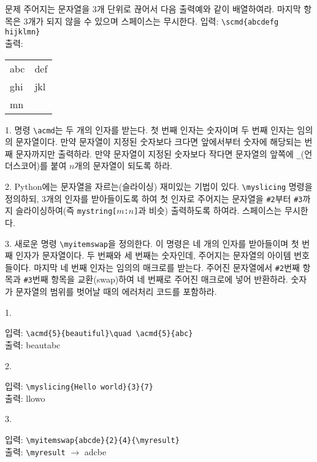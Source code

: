 \documentclass[a4paper,amsmath,itemph]{oblivoir}
\begin{document}
\vfill

\clearpage

\begin{questiona}{문제}
주어지는 문자열을 3개 단위로 끊어서 다음 출력예와 같이 배열하여라. 마지막 항목은 3개가 되지 않을 수 있으며 스페이스는 무시한다.
\tcblower
입력: \verb|\scmd{abcdefg hijklmn}|\\
출력: 
\begin{tabular}[t]{ll}
abc & def \\
ghi & jkl \\
mn & \\
\end{tabular}
\end{questiona}

\vfill

\begin{questionp}
 1. 명령 \verb|\acmd|는 두 개의 인자를 받는다. 첫 번째 인자는 숫자이며 두 번째 인자는 임의의 문자열이다. 만약 문자열이 지정된 숫자보다 크다면 앞에서부터 숫자에 해당되는 번째 문자까지만 출력하라. 만약 문자열이 지정된 숫자보다 작다면 문자열의 앞쪽에 \verb|_|(언더스코어)를 붙여 $n$개의 문자열이 되도록 하라.

\bigskip

 2. Python에는 문자열을 자르는(슬라이싱) 재미있는 기법이 있다. \verb|\myslicing| 명령을 정의하되, 3개의 인자를 받아들이도록 하여 첫 인자로 주어지는 문자열을 \verb|#2|부터 \verb|#3|까지 슬라이싱하여(즉 \verb|mystring[|$m$\verb|:|$n$\verb|]|과 비슷) 출력하도록 하여라. 스페이스는 무시한다.

\bigskip

 3. 새로운 명령 \verb|\myitemswap|을 정의한다. 이 명령은 네 개의 인자를 받아들이며 첫 번째 인자가 문자열이다. 두 번째와 세 번째는 숫자인데, 주어지는 문자열의 아이템 번호들이다. 마지막 네 번째 인자는 임의의 매크로를 받는다. 주어진 문자열에서 \verb|#2|번째 항목과 \verb|#3|번째 항목을 교환(swap)하여 네 번째로 주어진 매크로에 넣어 반환하라. 숫자가 문자열의 범위를 벗어날 때의 에러처리 코드를 포함하라.

\tcblower

1. \begin{minipage}[t]{\dimexpr\textwidth-3em\relax}
입력: \verb|\acmd{5}{beautiful}\quad \acmd{5}{abc}| \\
출력: beaut\quad \textunderscore\textunderscore abc
\end{minipage}

\medskip

2. \begin{minipage}[t]{\dimexpr\textwidth-3em\relax}
입력: \verb|\myslicing{Hello world}{3}{7}| \\
출력: llowo
\end{minipage}

\medskip

3. \begin{minipage}[t]{\dimexpr\textwidth-3em\relax}
입력: \verb|\myitemswap{abcde}{2}{4}{\myresult}| \\
출력: \verb|\myresult| $\rightarrow$ adcbe
\end{minipage} 
\end{questionp}
\end{document}
